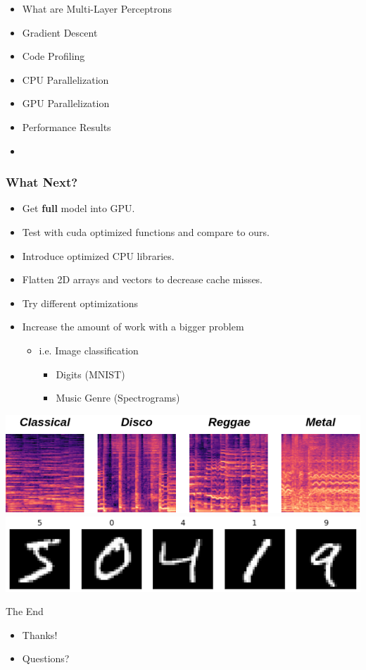 \begin{frame}
\begin{itemize}
    \item What are Multi-Layer Perceptrons
    \item Gradient Descent
    \item Code Profiling
    \item CPU Parallelization
    \item GPU Parallelization
    \item Performance Results 
    \item \textbf{\color{red}{Next Steps}}
\end{itemize}
\end{frame}

\begin{frame}
    \frametitle{What Next?}
    \begin{itemize}
        \item Get \textbf{full} model into GPU.
        \item Test with cuda optimized functions and compare to ours. 
        \item Introduce optimized CPU libraries.
        \item Flatten 2D arrays and vectors to decrease cache misses.
	\item Try different optimizations
	\item Increase the amount of work with a bigger problem
	\begin{itemize}
            \item i.e. Image classification
            \begin{itemize}
                \item Digits (MNIST)
                \item Music Genre (Spectrograms)
            \end{itemize}
        \end{itemize}
    \end{itemize}
    \center\includegraphics[width=.7\textwidth]{Images/spectrograms.png}
    \center\includegraphics[width=.7\textwidth]{Images/mnist.png}
\end{frame}

\begin{frame}{The End}
    \begin{itemize}
        \item Thanks!
        \item Questions?
    \end{itemize}
\end{frame}
